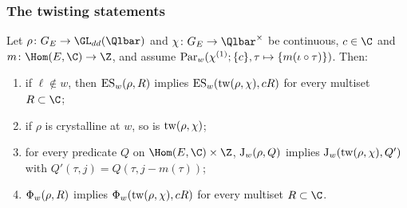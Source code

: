 \subsubsection{The twisting statements}

\begin{proposition}[(S7)--(S10)]\label{pf:geo:twists}
Let $\rho\colon G_E\to\GL_{dd}(\Qlbar)$ and $\chi\colon G_E\to\Qlbar^\times$ be continuous, $c\in\C$ and
$m\colon\Hom(E,\C)\to\Z$, and assume $\mathrm{Par}_w(\chi^{(1)};\{c\},\tau\mapsto\{m(\iota\circ\tau)\})$. Then:
\begin{enumerate}[label=\textup{(S\arabic*)},start=7,nosep]
\item if $\ell\notin w$, then $\mathrm{ES}_w(\rho,R)$ implies $\mathrm{ES}_w(\mathrm{tw}(\rho,\chi),cR)$ for every multiset
  $R\subset\C$;
\item if $\rho$ is crystalline at $w$, so is $\mathrm{tw}(\rho,\chi)$;
\item for every predicate $Q$ on $\Hom(E,\C)\times\Z$, $\mathrm{J}_w(\rho,Q)$ implies $\mathrm{J}_w(\mathrm{tw}(\rho,\chi),Q')$
  with $Q'(\tau,j)=Q(\tau,j-m(\tau))$;
\item $\Phi_w(\rho,R)$ implies $\Phi_w(\mathrm{tw}(\rho,\chi),cR)$ for every multiset $R\subset\C$.
\end{enumerate}
\end{proposition}

